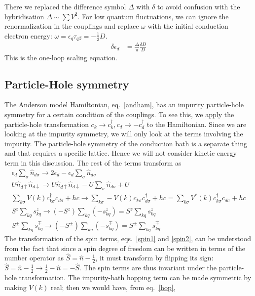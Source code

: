 \documentclass[twoside]{report}
\numberwithin{equation}{section}
\begin{document}
There we replaced the difference symbol \(\Delta\) with \(\delta\) to avoid confusion with the hybridisation \(\Delta \sim \sum V^2\). For low quantum fluctuations, we can ignore the renormalization in the couplings and replace \(\omega\) with the initial conduction electron energy: \(\omega = \epsilon_q\tau_{q\beta} = -\frac{1}{2} D\).
\begin{equation}\begin{aligned}
\delta \epsilon_d &= \frac{\Delta}{\pi}\frac{\delta D}{D}
\end{aligned}\end{equation}
This is the one-loop scaling equation.
\subsection{Particle-Hole symmetry}
The Anderson model Hamiltonian, eq.~\ref{andham}, has an impurity particle-hole symmetry for a certain condition of the couplings. To see this, we apply the particle-hole transformation \(c_k \to c^\dagger_k, c_d \to -c^\dagger_d\) to the Hamiltonian. Since we are looking at the impurity symmetry, we will only look at the terms involving the impurity. The particle-hole symmetry of the conduction bath is a separate thing and that requires a specific lattice. Hence we will not consider kinetic energy term in this discussion. The rest of the terms transform as
\begin{gather}
    \epsilon_d \sum_\sigma \hat n_{d\sigma} \to 2\epsilon_d - \epsilon_d \sum_\sigma \hat n_{d\sigma}\label{imp1}\\
U \hat n_{d\uparrow}\hat n_{d\downarrow} \to U \hat n_{d\uparrow}\hat n_{d\downarrow} - U\sum_\sigma \hat n_{d\sigma} + U\label{imp2}\\
\sum_{k\sigma}V(k)c^\dagger_{k\sigma}c_{d\sigma} + hc \to \sum_{k\sigma}-V(k)c_{k\sigma}c^\dagger_{d\sigma} + hc = \sum_{k\sigma}V^*(k)c^\dagger_{k\sigma}c_{d\sigma} + hc \label{hop}\\
S^z\sum_{kq}s^z_{kq} \to \left(-S^z\right)\sum_{kq}\left(-s^z_{kq}\right) = S^z\sum_{kq}s^z_{kq}\label{spin1}\\
S^{\pm}\sum_{kq}s^{\mp}_{kq} \to \left(-S^{\pm}\right)\sum_{kq}\left(-s^{\mp}_{kq}\right) = S^{\pm}\sum_{kq}s^{\mp}_{kq}\label{spin2}
\end{gather}
The transformation of the spin terms, eqs.~\ref{spin1} and \ref{spin2}, can be understood from the fact that since a spin degree of freedom can be written in terms of the number operator as \(\hat S = \hat n - \frac{1}{2}\), it must transform by flipping its sign: \(\hat S = \hat n - \frac{1}{2} \to \frac{1}{2} - \hat n = -\hat S\). The spin terms are thus invariant under the particle-hole transformation. The impurity-bath hopping term can be made symmetric by making \(V(k)\) real; then we would have, from eq.~\ref{hop},
\end{document}
